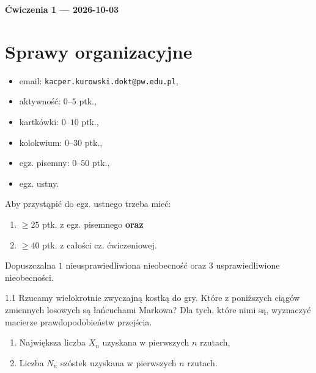 \documentclass[dvipsnames]{book}
\begin{document}
\begin{center}
  {\Large\bfseries Ćwiczenia 1 --- 2026-10-03}
\end{center}

\section*{Sprawy organizacyjne}

\begin{itemize}[topsep=0pt,itemsep=0pt]
  \item email: \texttt{kacper.kurowski.dokt@pw.edu.pl},
  \item aktywność: $0$--$5$ ptk.,
  \item kartkówki: $0$--$10$ ptk.,
  \item kolokwium: $0$--$30$ ptk.,
  \item egz. pisemny: $0$--$50$ ptk.,
  \item egz. ustny.
\end{itemize}

Aby przystąpić do egz. ustnego trzeba mieć:
\begin{enumerate}[label=\arabic*)]
  \item $\geq 25$ ptk. z egz. pisemnego \textbf{oraz}
  \item $\geq 40$ ptk. z całości cz. ćwiczeniowej.
\end{enumerate}

Dopuszczalna $1$ nieusprawiedliwiona nieobecność oraz $3$ usprawiedliwione
nieobecności.

\hrulefill

\begin{zadanie}{1.1}
Rzucamy wielokrotnie zwyczajną kostką do gry. Które z poniższych ciągów
zmiennych losowych są łańcuchami Markowa? Dla tych, które nimi są, wyznaczyć
macierze prawdopodobieństw przejścia.
\begin{enumerate}
  \item Największa liczba $X_n$ uzyskana w pierwszych $n$ rzutach,
  \item Liczba $N_n$ szóstek uzyskana w pierwszych $n$ rzutach.
\end{enumerate}
\end{zadanie}
\end{document}

